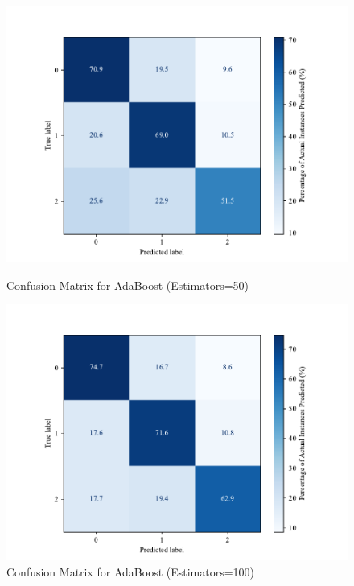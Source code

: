     \begin{figure}[htbp]
        \centering
        \begin{minipage}[b]{0.45\textwidth}
        \centering
        \includegraphics[width=\textwidth]{images/confusion_matrix_adaboost50.pdf}
        \caption{Confusion Matrix for AdaBoost (Estimators=50)}
        \label{fig:confusion_adaboost_50}
        \end{minipage}
        \hfill
        \begin{minipage}[b]{0.45\textwidth}
        \centering
        \includegraphics[width=\textwidth]{images/confusion_matrix_adaboost100.pdf}
        \caption{Confusion Matrix for AdaBoost (Estimators=100)}
        \label{fig:confusion_adaboost_100}
        \end{minipage}
        \end{figure}
        
